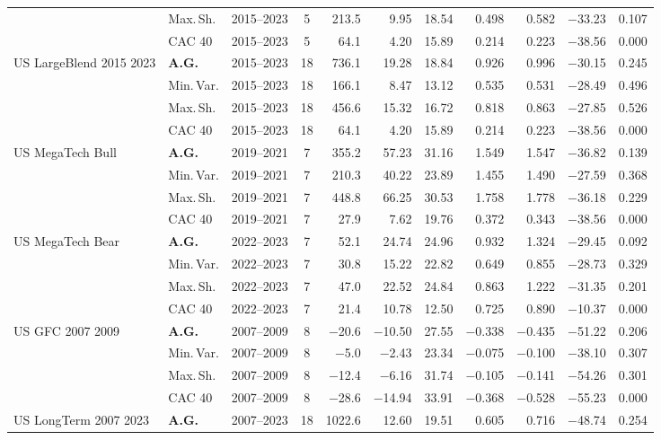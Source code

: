 \begin{longtable}{p{2.6cm} l c c r r r r r r r}
 & Max.\,Sh. & 2015--2023 & 5 & 213.5 & 9.95 & 18.54 & 0.498 & 0.582 & $-$33.23 & 0.107 \\
 & CAC 40 & 2015--2023 & 5 & 64.1 & 4.20 & 15.89 & 0.214 & 0.223 & $-$38.56 & 0.000 \\
\midrule
US LargeBlend 2015 2023 & \textbf{A.G.} & 2015--2023 & 18 & 736.1 & 19.28 & 18.84 & 0.926 & 0.996 & $-$30.15 & 0.245 \\
 & Min.\,Var. & 2015--2023 & 18 & 166.1 & 8.47 & 13.12 & 0.535 & 0.531 & $-$28.49 & 0.496 \\
 & Max.\,Sh. & 2015--2023 & 18 & 456.6 & 15.32 & 16.72 & 0.818 & 0.863 & $-$27.85 & 0.526 \\
 & CAC 40 & 2015--2023 & 18 & 64.1 & 4.20 & 15.89 & 0.214 & 0.223 & $-$38.56 & 0.000 \\
\midrule
US MegaTech Bull & \textbf{A.G.} & 2019--2021 & 7 & 355.2 & 57.23 & 31.16 & 1.549 & 1.547 & $-$36.82 & 0.139 \\
 & Min.\,Var. & 2019--2021 & 7 & 210.3 & 40.22 & 23.89 & 1.455 & 1.490 & $-$27.59 & 0.368 \\
 & Max.\,Sh. & 2019--2021 & 7 & 448.8 & 66.25 & 30.53 & 1.758 & 1.778 & $-$36.18 & 0.229 \\
 & CAC 40 & 2019--2021 & 7 & 27.9 & 7.62 & 19.76 & 0.372 & 0.343 & $-$38.56 & 0.000 \\
\midrule
US MegaTech Bear & \textbf{A.G.} & 2022--2023 & 7 & 52.1 & 24.74 & 24.96 & 0.932 & 1.324 & $-$29.45 & 0.092 \\
 & Min.\,Var. & 2022--2023 & 7 & 30.8 & 15.22 & 22.82 & 0.649 & 0.855 & $-$28.73 & 0.329 \\
 & Max.\,Sh. & 2022--2023 & 7 & 47.0 & 22.52 & 24.84 & 0.863 & 1.222 & $-$31.35 & 0.201 \\
 & CAC 40 & 2022--2023 & 7 & 21.4 & 10.78 & 12.50 & 0.725 & 0.890 & $-$10.37 & 0.000 \\
\midrule
US GFC 2007 2009 & \textbf{A.G.} & 2007--2009 & 8 & $-$20.6 & $-$10.50 & 27.55 & $-$0.338 & $-$0.435 & $-$51.22 & 0.206 \\
 & Min.\,Var. & 2007--2009 & 8 & $-$5.0 & $-$2.43 & 23.34 & $-$0.075 & $-$0.100 & $-$38.10 & 0.307 \\
 & Max.\,Sh. & 2007--2009 & 8 & $-$12.4 & $-$6.16 & 31.74 & $-$0.105 & $-$0.141 & $-$54.26 & 0.301 \\
 & CAC 40 & 2007--2009 & 8 & $-$28.6 & $-$14.94 & 33.91 & $-$0.368 & $-$0.528 & $-$55.23 & 0.000 \\
\midrule
US LongTerm 2007 2023 & \textbf{A.G.} & 2007--2023 & 18 & 1022.6 & 12.60 & 19.51 & 0.605 & 0.716 & $-$48.74 & 0.254 \\

\end{longtable}
